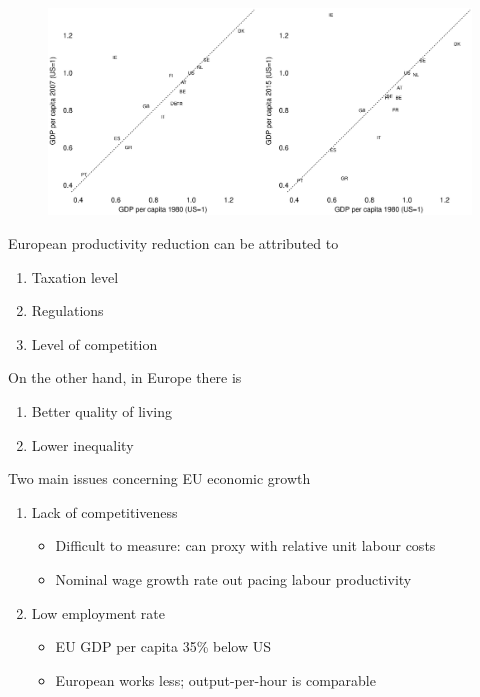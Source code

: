 \documentclass{beamer}
\begin{document}
\begin{frame}
  \begin{figure}
    \includegraphics[scale=.3]{versus_us3.eps}
  \end{figure}
\end{frame}

\begin{frame}
  European productivity reduction can be attributed to 
  \begin{enumerate}
  \item Taxation level
  \item Regulations
  \item Level of competition
\end{enumerate}
\medskip
On the other hand, in Europe there is
\begin{enumerate}
   \item Better quality of living
   \item Lower inequality
 \end{enumerate} 
\end{frame}

\begin{frame}
  Two main issues concerning EU economic growth
  \begin{enumerate}
    \item Lack of competitiveness
    \begin{itemize}
      \item Difficult to measure:  can proxy with relative unit labour costs
      \item Nominal wage growth rate out pacing labour productivity
    \end{itemize}
    \medskip
    \item Low employment rate
    \begin{itemize}
      \item EU GDP per capita 35\% below US
      \item European works less; output-per-hour is comparable
    \end{itemize}
  \end{enumerate}
\end{frame}
\end{document}
